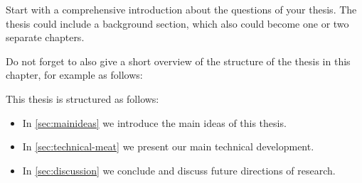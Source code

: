 Start with a comprehensive introduction about the questions of your thesis.
The thesis could include a background section, which also could become one or two separate chapters.

Do not forget to also give a short overview of the structure of the thesis in this chapter, for example as follows:

\medskip
This thesis is structured as follows:
\begin{itemize}
    \item In \cref{sec:mainideas} we introduce the main ideas of this thesis.
    \item In \cref{sec:technical-meat} we present our main technical development.
    \item In \cref{sec:discussion} we conclude and discuss future directions of research.
\end{itemize}

